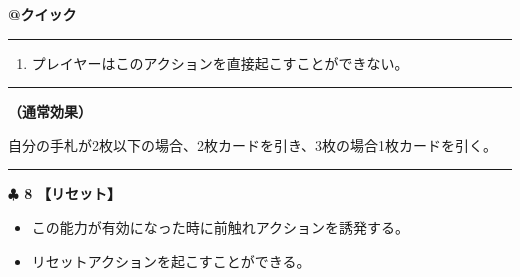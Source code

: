 \documentclass[twocolumn,a5paper,papersize,10pt]{jarticle}
\begin{document}
\begin{tcolorbox}[title={\small\bf【Action】手札補充}{\scriptsize （誘発）}]

{\scriptsize\bf @クイック }

\vspace{1mm} %
\hrule height 0.1mm depth 0mm width 62mm %
\vspace{1mm} %


\vspace{-1zh}%
\begin{enumerate}
\renewcommand{\labelenumi}{※}
\setlength{\leftskip}{-0.3cm}
\setlength{\itemsep}{0pt} %
\setlength{\parskip}{0pt} %

\item プレイヤーはこのアクションを直接起こすことができない。

\vspace{-3mm}%
\end{enumerate}
\vspace{-2mm} %
\vspace{1zh}%
\vspace{1mm} %
\hrule height 0.1mm depth 0mm width 62mm %
\vspace{1mm} %

{\bf（通常効果）}

自分の手札が2枚以下の場合、2枚カードを引き、3枚の場合1枚カードを引く。

\vspace{1mm} %
\end{tcolorbox}

\vspace{-1zh}
  
 

\vspace{3mm} %
\hrule height 0.5mm depth 0mm width 66.5mm %
\vspace{1mm} %
{\Large\bf $\clubsuit$ 8} {\normalsize\bf【リセット】} %
\vspace{1mm} %


\vspace{-1zh}%
\begin{itemize}
\setlength{\leftskip}{-0.3cm}
\setlength{\parskip}{0pt} %

\item この能力が有効になった時に前触れアクションを誘発する。

\item リセットアクションを起こすことができる。
\vspace{-1zh}%
\end{itemize}
\end{document}
